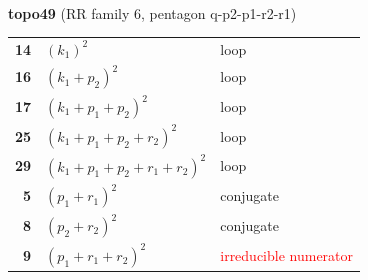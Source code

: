 \documentclass[10pt]{article}
\begin{document}
\begin{minipage}[t]{0.48\textwidth}
{}\\[2mm]\textbf{topo49} (RR family 6, pentagon q-p2-p1-r2-r1)\\[2pt]{\footnotesize\begin{tabular}{@{}r@{\ \ }l@{\ \ }l@{}}\textbf{14} & $(k_1)^2$ & loop\\
\textbf{16} & $(k_1+p_2)^2$ & loop\\
\textbf{17} & $(k_1+p_1+p_2)^2$ & loop\\
\textbf{25} & $(k_1+p_1+p_2+r_2)^2$ & loop\\
\textbf{29} & $(k_1+p_1+p_2+r_1+r_2)^2$ & loop\\
\textbf{5} & $(p_1+r_1)^2$ & conjugate\\
\textbf{8} & $(p_2+r_2)^2$ & conjugate\\
\textbf{9} & $(p_1+r_1+r_2)^2$ & \textcolor{red}{irreducible numerator}\\\end{tabular}}\end{minipage}\hfill%
\end{document}
